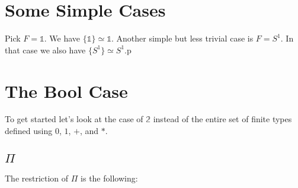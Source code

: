 \documentclass[format=acmlarge,review,natbib]{acmart}
\newcommand{\ot}{\mathbb{1}}
\newcommand{\bt}{\mathbb{2}}
\begin{document}
\section{Some Simple Cases}

Pick $F = \ot$. We have $\{\ot\} \simeq \ot$. Another
simple but less trivial case is $F = S^1$. In that case we also have
$\{S^1\} \simeq S^1$.p

\section{The Bool Case}

To get started let's look at the case of $\bt$ instead of the entire set of finite types defined using $0$, $1$, $+$, and $*$.

\subsection{$\Pi$}

The restriction of $\Pi$ is the following:
\end{document}
